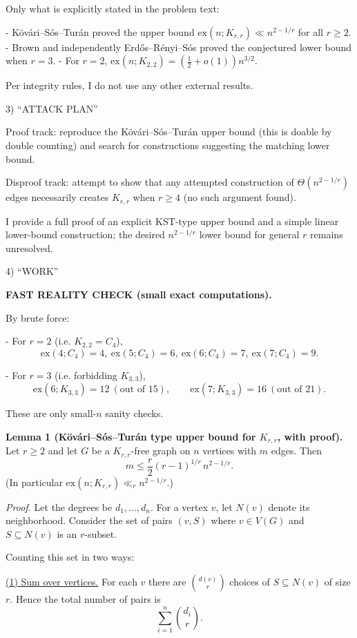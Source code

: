 Only what is explicitly stated in the problem text:

- K\"{o}v\'{a}ri--S\'{o}s--Tur\'{a}n proved the upper bound $\mathrm{ex}(n;K_{r,r})\ll n^{2-1/r}$ for all $r\ge 2$.
- Brown and independently Erd\H{o}s--R\'{e}nyi--S\'{o}s proved the conjectured lower bound when $r=3$.
- For $r=2$, $\mathrm{ex}(n;K_{2,2})=(\tfrac12+o(1))n^{3/2}$.

Per integrity rules, I do not use any other external results.

3) “ATTACK PLAN”

Proof track: reproduce the K\"{o}v\'{a}ri--S\'{o}s--Tur\'{a}n upper bound (this is doable by double counting) and search for constructions suggesting the matching lower bound.

Disproof track: attempt to show that any attempted construction of $\Theta(n^{2-1/r})$ edges necessarily creates $K_{r,r}$ when $r\ge 4$ (no such argument found).

I provide a full proof of an explicit KST-type upper bound and a simple linear lower-bound construction; the desired $n^{2-1/r}$ lower bound for general $r$ remains unresolved.

4) “WORK”

\textbf{FAST REALITY CHECK (small exact computations).}

By brute force:

- For $r=2$ (i.e. $K_{2,2}=C_4$),
\[
\mathrm{ex}(4;C_4)=4,\ \mathrm{ex}(5;C_4)=6,\ \mathrm{ex}(6;C_4)=7,\ \mathrm{ex}(7;C_4)=9.
\]

- For $r=3$ (i.e. forbidding $K_{3,3}$),
\[
\mathrm{ex}(6;K_{3,3})=12\ (\text{out of }15),\qquad \mathrm{ex}(7;K_{3,3})=16\ (\text{out of }21).
\]

These are only small-$n$ sanity checks.

\medskip
\textbf{Lemma 1 (K\"{o}v\'{a}ri--S\'{o}s--Tur\'{a}n type upper bound for $K_{r,r}$, with proof).}
Let $r\ge 2$ and let $G$ be a $K_{r,r}$-free graph on $n$ vertices with $m$ edges.
Then
\[
 m \le \frac{r}{2}(r-1)^{1/r}\, n^{2-1/r}.
\]
(In particular $\mathrm{ex}(n;K_{r,r})\ll_r n^{2-1/r}$.)

\emph{Proof.}
Let the degrees be $d_1,\dots,d_n$.
For a vertex $v$, let $N(v)$ denote its neighborhood.
Consider the set of pairs $(v,S)$ where $v\in V(G)$ and $S\subseteq N(v)$ is an $r$-subset.

Counting this set in two ways:

\underline{(1) Sum over vertices.}
For each $v$ there are $\binom{d(v)}{r}$ choices of $S\subseteq N(v)$ of size $r$. Hence the total number of pairs is
\[
\sum_{i=1}^n \binom{d_i}{r}.
\]

